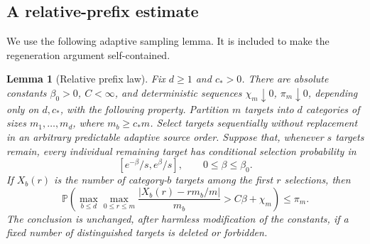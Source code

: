 \documentclass[11pt]{article}
\newtheorem{lemma}[theorem]{Lemma}
\theoremstyle{definition}
\theoremstyle{remark}
\newcommand{\Pp}{\mathbb P}
\begin{document}
\subsection{A relative-prefix estimate}

We use the following adaptive sampling lemma.  It is included to make the
regeneration argument self-contained.

\begin{lemma}[Relative prefix law]
\label{lem:relative-prefix}
Fix $d\ge1$ and $c_*>0$.  There are absolute constants
$\beta_0>0$, $C<\infty$, and deterministic sequences
$\chi_m\downarrow0$, $\pi_m\downarrow0$, depending only on $d,c_*$, with the
following property.  Partition $m$ targets into $d$ categories of sizes
$m_1,\ldots,m_d$, where $m_b\ge c_*m$.  Select targets sequentially without
replacement in an arbitrary predictable adaptive source order.  Suppose that,
whenever $s$ targets remain, every individual remaining target has conditional
selection probability in
\[
  [e^{-\beta}/s,e^\beta/s],
  \qquad 0\le\beta\le\beta_0.
\]
If $X_b(r)$ is the number of category-$b$ targets among the first $r$
selections, then
\begin{equation}
 \Pp\left(
 \max_{b\le d}\max_{0\le r\le m}
 \frac{|X_b(r)-rm_b/m|}{m_b}>C\beta+\chi_m
 \right)\le\pi_m.
 \label{eq:relative-prefix}
\end{equation}
The conclusion is unchanged, after harmless modification of the constants, if
a fixed number of distinguished targets is deleted or forbidden.
\end{lemma}
\end{document}
